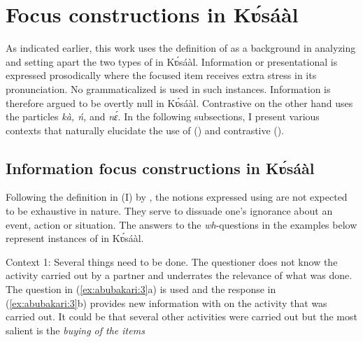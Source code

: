 \documentclass[output=paper
,newtxmath
,modfonts
,nonflat]{langsci/langscibook}
\begin{document}
\section{Focus constructions in Kʋ́sáàl}

As indicated earlier, this work uses the definition of \citet{ÉKiss1998} as a background in analyzing and setting apart the two types of  in Kʋ́sáàl. Information or presentational  is expressed prosodically where the focused item receives extra stress in its pronunciation. No grammaticalized  is used in such instances. Information  is therefore argued to be overtly null in Kʋ́sáàl. Contrastive  on the other hand uses the particles \textit{kà, ń,} and \textit{nɛ́}. In the following subsections, I present various contexts that naturally elucidate the use of  () and contrastive  ().

\subsection{Information focus constructions in Kʋ́sáàl}\label{sec:abubakari:2.1}

Following the definition in (I) by \citet[246]{ÉKiss1998}, the notions expressed using  are not expected to be exhaustive in nature. They serve to dissuade one’s ignorance about an event, action or situation. The answers to the \textit{wh}{}-questions in the examples below represent instances of  in Kʋ́sáàl. 

Context 1: Several things need to be done. The questioner does not know the activity carried out by a partner and underrates the relevance of what was done. The question in (\ref{ex:abubakari:3}a) is used and the response in (\ref{ex:abubakari:3}b) provides new information with  on the activity that was carried out. It could be that several other activities were carried out but the most salient is the \textit{buying of the items}
 
\end{document}
